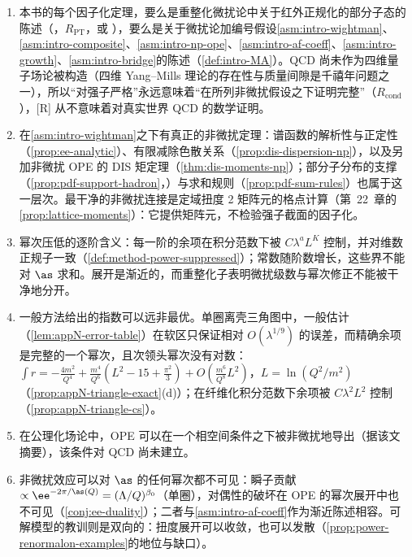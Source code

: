\begin{remark}[非微扰地位]\label{rem:power-np-status}
\begin{enumerate}[label=(\roman*),leftmargin=1.8em,itemsep=1pt,topsep=2pt]
\item 本书的每个因子化定理，要么是重整化微扰论中关于红外正规化的部分子态的陈述（\tagR，$R_{\mathrm{PT}}$，或 \tagA），要么是关于微扰论加编号假设\cref{asm:intro-wightman}、\cref{asm:intro-composite}、\cref{asm:intro-np-ope}、\cref{asm:intro-af-coeff}、\cref{asm:intro-growth}、\cref{asm:intro-bridge}的陈述（\cref{def:intro-MA}）。QCD 尚未作为四维量子场论被构造（四维 Yang--Mills 理论的存在性与质量间隙是千禧年问题之一），所以“对强子严格”永远意味着“在所列非微扰假设之下证明完整”（$R_{\mathrm{cond}}$），[R] 从不意味着对真实世界 QCD 的数学证明。%
\item 在\cref{asm:intro-wightman}之下有真正的非微扰定理：谱函数的解析性与正定性（\cref{prop:ee-analytic}）、有限减除色散关系（\cref{prop:dis-dispersion-np}），以及另加非微扰 OPE 的 DIS 矩定理（\cref{thm:dis-moments-np}）；部分子分布的支撑（\cref{prop:pdf-support-hadron}，\tagA）与求和规则（\cref{prop:pdf-sum-rules}）也属于这一层次。最干净的非微扰连接是定域扭度 2 矩阵元的格点计算（第~22~章的\cref{prop:lattice-moments}）：它提供矩阵元，不检验强子截面的因子化。
\item 幂次压低的逐阶含义：每一阶的余项在积分范数下被 $C\lambda^aL^K$ 控制，并对维数正规子一致（\cref{def:method-power-suppressed}）；常数随阶数增长，这些界不能对 $\as$ 求和。展开是渐近的，而重整化子表明微扰级数与幂次修正不能被干净地分开。
\item 一般方法给出的指数可以远非最优。单圈离壳三角图中，一般估计（\cref{lem:appN-error-table}）在软区只保证相对 $O(\lambda^{1/9})$ 的误差，而精确余项是完整的一个幂次，且次领头幂次没有对数：$\int r=-\frac{4m^2}{Q^4}+\frac{m^4}{Q^6}(L^2-15+\frac{\pi^2}{3})+O(\frac{m^6}{Q^8}L^2)$，$L=\ln(Q^2/m^2)$（\cref{prop:appN-triangle-exact}(d)）；在纤维化积分范数下余项被 $C\lambda^2L^2$ 控制（\cref{prop:appN-triangle-cs}）。
\item 在公理化场论中，OPE 可以在一个相空间条件之下被非微扰地导出（据该文摘要）\cite{Bostelmann:2005rr}，该条件对 QCD 尚未建立。
\item 非微扰效应可以对 $\as$ 的任何幂次都不可见：瞬子贡献 $\propto\ee^{-2\pi/\as(Q)}=(\Lambda/Q)^{\beta_0}$（单圈），对偶性的破坏在 OPE 的幂次展开中也不可见（\cref{conj:ee-duality}）；二者与\cref{asm:intro-af-coeff}作为渐近陈述相容。可解模型的教训则是双向的：扭度展开可以收敛，也可以发散（\cref{prop:power-renormalon-examples}的地位与缺口）。
\end{enumerate}
\end{remark}

